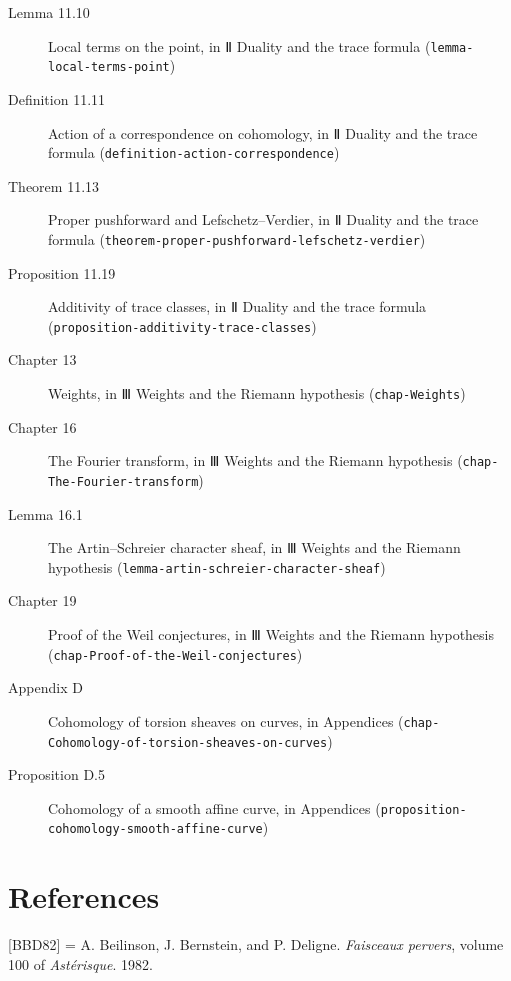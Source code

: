 \documentclass[11pt]{article}
\newcommand{\bpslug}[1]{\texttt{#1}}
\newcommand{\bpbibitem}[3]{\par\setbox0\hbox{[#1]\enspace}\ifdim\wd0<5em\setbox0\hbox to 5em{[#1]\hfil}\fi
  \hangindent=\wd0 \hangafter=1 \noindent\box0\phantomsection\label{#2}#3\par\smallskip}
\begin{document}
\begin{description}
\item[Lemma 11.10] Local terms on the point, in Ⅱ Duality and the trace formula (\bpslug{lemma-{}\allowbreak{}local-{}\allowbreak{}terms-{}\allowbreak{}point})
\item[Definition 11.11] Action of a correspondence on cohomology, in Ⅱ Duality and the trace formula (\bpslug{definition-{}\allowbreak{}action-{}\allowbreak{}correspondence})
\item[Theorem 11.13] Proper pushforward and Lefschetz–Verdier, in Ⅱ Duality and the trace formula (\bpslug{theorem-{}\allowbreak{}proper-{}\allowbreak{}pushforward-{}\allowbreak{}lefschetz-{}\allowbreak{}verdier})
\item[Proposition 11.19] Additivity of trace classes, in Ⅱ Duality and the trace formula (\bpslug{proposition-{}\allowbreak{}additivity-{}\allowbreak{}trace-{}\allowbreak{}classes})
\item[Chapter 13] Weights, in Ⅲ Weights and the Riemann hypothesis (\bpslug{chap-{}\allowbreak{}Weights})
\item[Chapter 16] The Fourier transform, in Ⅲ Weights and the Riemann hypothesis (\bpslug{chap-{}\allowbreak{}The-{}\allowbreak{}Fourier-{}\allowbreak{}transform})
\item[Lemma 16.1] The Artin–Schreier character sheaf, in Ⅲ Weights and the Riemann hypothesis (\bpslug{lemma-{}\allowbreak{}artin-{}\allowbreak{}schreier-{}\allowbreak{}character-{}\allowbreak{}sheaf})
\item[Chapter 19] Proof of the Weil conjectures, in Ⅲ Weights and the Riemann hypothesis (\bpslug{chap-{}\allowbreak{}Proof-{}\allowbreak{}of-{}\allowbreak{}the-{}\allowbreak{}Weil-{}\allowbreak{}conjectures})
\item[Appendix D] Cohomology of torsion sheaves on curves, in Appendices (\bpslug{chap-{}\allowbreak{}Cohomology-{}\allowbreak{}of-{}\allowbreak{}torsion-{}\allowbreak{}sheaves-{}\allowbreak{}on-{}\allowbreak{}curves})
\item[Proposition D.5] Cohomology of a smooth affine curve, in Appendices (\bpslug{proposition-{}\allowbreak{}cohomology-{}\allowbreak{}smooth-{}\allowbreak{}affine-{}\allowbreak{}curve})
\end{description}
\clearpage{}%
\section*{References}
\bpbibitem{BBD82}{bp107}{A. Beilinson, J. Bernstein, and P. Deligne. \emph{Faisceaux pervers}, volume 100 of \emph{Astérisque}. 1982.}
\end{document}
